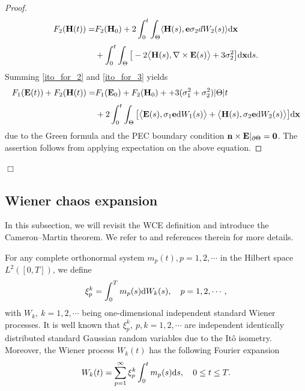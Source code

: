 \documentclass[preprint,12pt]{article}
\newtheorem{proof}{Proof}
\numberwithin{figure}{section}
\numberwithin{table}{section}
\numberwithin{equation}{section}
\begin{document}
\begin{proof}
\begin{equation}
			\begin{split}
				F_2({\bf H}(t))=&F_2({\bf H}_0)+2\int_0^t\int_\Theta\langle {\bf H}(s),{\bf{e}}\sigma_{2}dW_2(s)\rangle{\rm d}{\bf x}\\[1mm]
				&+\int_0^t\int_\Theta\big[-2\big\langle{\bf H}(s),\nabla\times {\bf E}(s)\big\rangle+3\sigma_{2}^2\big]{\rm d}{\bf x}{\rm d}s.
			\end{split}
		\end{equation}
		Summing \eqref{ito_for_2} and \eqref{ito_for_3} yields
		\begin{equation*}\label{ito_for_23}
			\begin{split}
				F_1({\bf E}(t))+F_2({\bf H}(t))=&F_1({\bf E}_0)+F_2({\bf H}_0)++3(\sigma_1^2+\sigma_2^2)|\Theta|t\\[1mm]
				&+2\int_0^t\int_\Theta\big[\big\langle {\bf E}(s),\sigma_{1}{\bf{e}}{\rm d}W_1(s)\big\rangle +\big\langle {\bf H}(s),\sigma_{2}{\bf{e}}{\rm d}W_2(s)\big\rangle\big]{\rm d}{\bf x}
			\end{split}
		\end{equation*}
		due to the Green formula and the PEC boundary condition ${\bf n}\times{\bf E}|_{\partial \Theta}={\bf 0}$. The assertion follows from applying expectation on the above equation.
\end{proof}
\hfill $\Box$
\subsection{Wiener chaos expansion}
\label{sub_WCE}
In this subsection, we will revisit the WCE definition and introduce the Cameron--Martin theorem. We refer to \cite{Luo,RefHLRZ2006,RefMR2004,RefZRTK2012} and references therein for more details.

For any complete orthonormal system $m_{p}(t),p=1,2,\cdots$ in the Hilbert space $L^{2}([0,T])$, we define
\begin{align*}
\xi_p^k=\int_{0}^{T}m_p(s){\rm d}W_k(s),\quad p=1,2,\cdots,
\end{align*}
with $W_k,~k=1,2,\cdots$ being one-dimensional independent standard Wiener processes. It is well known that $\xi_p^k,~p, k=1,2,\cdots$ are independent identically distributed standard Gaussian random variables due to the It\^o isometry. Moreover, the Wiener process $W_k(t)$ has the following Fourier expansion
\begin{align}\label{Wt}
    W_k(t)=\sum_{p=1}^{\infty}\xi_p^k\int_{0}^{t}m_p(s){\rm d}s,\quad 0\leq t \leq T.
\end{align}
\end{document}
